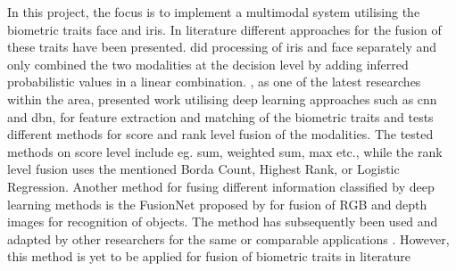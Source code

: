 In this project, the focus is to implement a multimodal system utilising the biometric traits face and iris. In literature different approaches for the fusion of these traits have been presented. \cite{Chen2005a} did processing of iris and face separately and only combined the two modalities at the decision level by adding inferred probabilistic values in a linear combination. \cite{Al-Waisy2017a}, as one of the latest researches within the area, presented work utilising deep learning approaches such as \gls{cnn} and \gls{dbn}, for feature extraction and matching of the biometric traits and tests different methods for score and rank level fusion of the modalities. The tested methods on score level include eg.  sum, weighted sum, max etc., while the rank level fusion uses the mentioned Borda Count, Highest Rank, or Logistic Regression. Another method for fusing different information classified by deep learning methods is the FusionNet proposed by \cite{Eitel2015} for fusion of RGB and depth images for recognition of objects. The method has subsequently been used and adapted by other researchers for the same or comparable applications \citep{Aakerberg2017, Li2017}. However, this method is yet to be applied for fusion of biometric traits in literature


